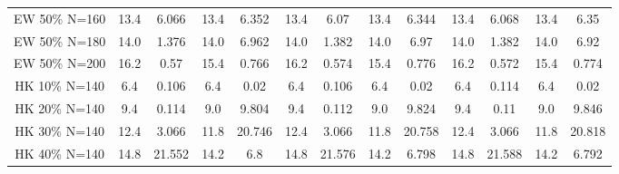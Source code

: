 \documentclass[landscape, 12pt]{report}
\begin{document}
\begin{tabular}{|c|cc|cc|cc|cc|cc|cc|}
	EW 50\% N=160 & 13.4 & 6.066 & 13.4 & 6.352 & 13.4 & 6.07 & 13.4 & 6.344 & 13.4 & 6.068 & 13.4 & 6.35
	\\
	EW 50\% N=180 & 14.0 & 1.376 & 14.0 & 6.962 & 14.0 & 1.382 & 14.0 & 6.97 & 14.0 & 1.382 & 14.0 & 6.92
	\\
	EW 50\% N=200 & 16.2 & 0.57 & 15.4 & 0.766 & 16.2 & 0.574 & 15.4 & 0.776 & 16.2 & 0.572 & 15.4 & 0.774
	\\
	\hline
	HK 10\% N=140 &  6.4 & 0.106 &  6.4 & 0.02 &  6.4 & 0.106 &  6.4 & 0.02 &  6.4 & 0.114 &  6.4 & 0.02
	\\
	HK 20\% N=140 &  9.4 & 0.114 &  9.0 & 9.804 &  9.4 & 0.112 &  9.0 & 9.824 &  9.4 & 0.11 &  9.0 & 9.846
	\\
	HK 30\% N=140 & 12.4 & 3.066 & 11.8 & 20.746 & 12.4 & 3.066 & 11.8 & 20.758 & 12.4 & 3.066 & 11.8 & 20.818
	\\
	HK 40\% N=140 & 14.8 & 21.552 & 14.2 &  6.8 & 14.8 & 21.576 & 14.2 & 6.798 & 14.8 & 21.588 & 14.2 & 6.792
	\\
	\hline 
	 \end{tabular}
	
	\clearpage
	
\end{document}
